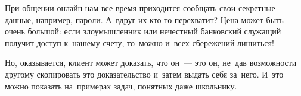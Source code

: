 



При общении онлайн нам все время приходится сообщать свои секретные данные,
например, пароли.
А~вдруг их кто-то перехватит?
Цена может быть очень большой: если злоумышленник или нечестный банковский
служащий получит доступ к~нашему счету, то~можно и~всех сбережений лишиться!

Но, оказывается, клиент может доказать, что он~--- это он, не~дав возможности
другому скопировать это доказательство и~затем выдать себя за~него.
И~это можно показать на~примерах задач, понятных даже школьнику.

